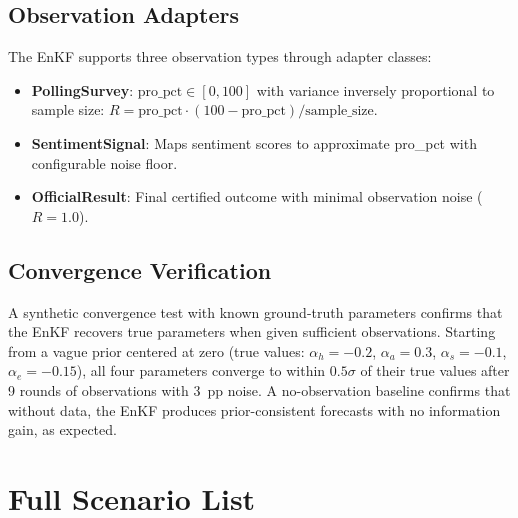 \documentclass[12pt]{article}
\begin{document}
\subsection{Observation Adapters}

The EnKF supports three observation types through adapter classes:

\begin{itemize}
    \item \textbf{PollingSurvey}: $\text{pro\_pct} \in [0, 100]$ with variance inversely proportional to sample size: $R = \text{pro\_pct} \cdot (100 - \text{pro\_pct}) / \text{sample\_size}$.
    \item \textbf{SentimentSignal}: Maps sentiment scores to approximate pro\_pct with configurable noise floor.
    \item \textbf{OfficialResult}: Final certified outcome with minimal observation noise ($R = 1.0$).
\end{itemize}

\subsection{Convergence Verification}

A synthetic convergence test with known ground-truth parameters confirms that the EnKF recovers true parameters when given sufficient observations. Starting from a vague prior centered at zero (true values: $\alpha_h = -0.2$, $\alpha_a = 0.3$, $\alpha_s = -0.1$, $\alpha_e = -0.15$), all four parameters converge to within $0.5\sigma$ of their true values after 9 rounds of observations with 3~pp noise. A no-observation baseline confirms that without data, the EnKF produces prior-consistent forecasts with no information gain, as expected.

\section{Full Scenario List}
\label{app:scenarios}
\end{document}
